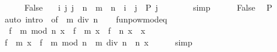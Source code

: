 \begin{isabellebody}
\ \ \ \ \isamarkupfalse%
\ False\ \isamarkupfalse%
\ {\isacharasterisk}{\kern0pt}{\isacharcolon}{\kern0pt}\ {\isachardoublequoteopen}{\isasymAnd}i\ j{\isachardot}{\kern0pt}\ j\ {\isacharless}{\kern0pt}\ n\ {\isasymLongrightarrow}\ m\ {\isacharequal}{\kern0pt}\ n\ {\isacharasterisk}{\kern0pt}\ i\ {\isacharplus}{\kern0pt}\ j\ {\isasymLongrightarrow}\ P\ j{\isachardoublequoteclose}\isanewline
\ \ \ \ \ \ \isamarkupfalse%
\ simp\isanewline
\ \ \ \ \isamarkupfalse%
\ False\ \isamarkupfalse%
\ {\isacharquery}{\kern0pt}P\isanewline
\ \ \ \ \ \ \isamarkupfalse%
\ {\isacharparenleft}{\kern0pt}auto\ intro{\isacharcolon}{\kern0pt}\ {\isacharasterisk}{\kern0pt}\ {\isacharbrackleft}{\kern0pt}of\ {\isacharunderscore}{\kern0pt}\ {\isachardoublequoteopen}m\ div\ n{\isachardoublequoteclose}{\isacharbrackright}{\kern0pt}{\isacharparenright}{\kern0pt}\isanewline
\ \ \isamarkupfalse%
\isanewline
{}\isamarkupfalse%
%
\endisatagproof
{\isafoldproof}%
%
\isadelimproof
\isanewline
%
\endisadelimproof
\isanewline
{}\isamarkupfalse%
\ funpow{\isacharunderscore}{\kern0pt}mod{\isacharunderscore}{\kern0pt}eq{\isacharcolon}{\kern0pt}\ \isanewline
\ \ {\isacartoucheopen}{\isacharparenleft}{\kern0pt}f\ {\isacharcircum}{\kern0pt}{\isacharcircum}{\kern0pt}\ {\isacharparenleft}{\kern0pt}m\ mod\ n{\isacharparenright}{\kern0pt}{\isacharparenright}{\kern0pt}\ x\ {\isacharequal}{\kern0pt}\ {\isacharparenleft}{\kern0pt}f\ {\isacharcircum}{\kern0pt}{\isacharcircum}{\kern0pt}\ m{\isacharparenright}{\kern0pt}\ x{\isacartoucheclose}\ \ {\isacartoucheopen}{\isacharparenleft}{\kern0pt}f\ {\isacharcircum}{\kern0pt}{\isacharcircum}{\kern0pt}\ n{\isacharparenright}{\kern0pt}\ x\ {\isacharequal}{\kern0pt}\ x{\isacartoucheclose}\isanewline
%
\isadelimproof
%
\endisadelimproof
%
\isatagproof
{}\isamarkupfalse%
\ {\isacharminus}{\kern0pt}\isanewline
\ \ \isamarkupfalse%
\ {\isacartoucheopen}{\isacharparenleft}{\kern0pt}f\ {\isacharcircum}{\kern0pt}{\isacharcircum}{\kern0pt}\ m{\isacharparenright}{\kern0pt}\ x\ {\isacharequal}{\kern0pt}\ {\isacharparenleft}{\kern0pt}f\ {\isacharcircum}{\kern0pt}{\isacharcircum}{\kern0pt}\ {\isacharparenleft}{\kern0pt}m\ mod\ n\ {\isacharplus}{\kern0pt}\ m\ div\ n\ {\isacharasterisk}{\kern0pt}\ n{\isacharparenright}{\kern0pt}{\isacharparenright}{\kern0pt}\ x{\isacartoucheclose}\isanewline
\ \ \ \ \isamarkupfalse%
\ simp\isanewline
\ \ \isamarkupfalse%
\ \isamarkupfalse%

\end{isabellebody}
